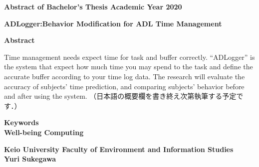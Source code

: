 \begin{center}
\textbf{\large Abstract of Bachelor's Thesis Academic Year 2020}

\vspace{6mm}

\textbf{\large ADLogger:Behavior Modification for ADL Time Management}
\end{center}

\vspace{10mm}


\begin{flushleft}
\textbf{Abstract}\\
\end{flushleft}

Time management needs expect time for task and buffer correctly. “ADLogger” is the system that expect how much time you may spend to the task and define the accurate buffer according to your time log data. The research will evaluate the accuracy of subjects’ time prediction, and comparing subjects’ behavior before and after using the system.
（日本語の概要欄を書き終え次第執筆する予定です．）

\begin{flushleft}
\textbf{Keywords}\\
\textbf{Well-being Computing}
\end{flushleft}

\begin{flushright}
\textbf{Keio University Faculty of Environment and Information Studies}\\
\textbf{Yuri Sukegawa}\\
\end{flushright}